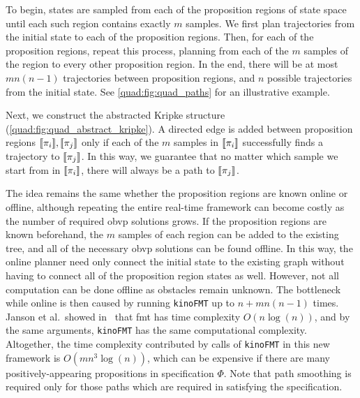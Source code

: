 To begin, states are sampled from each of the proposition regions of state space until each such region contains exactly $m$ samples. We first plan trajectories from the initial state to each of the proposition regions. Then, for each of the proposition regions, repeat this process, planning from each of the $m$ samples of the region to every other proposition region. In the end, there will be at most $mn(n-1)$ trajectories between proposition regions, and $n$ possible trajectories from the initial state. See \autoref{quad:fig:quad_paths} for an illustrative example.

Next, we construct the abstracted Kripke structure (\autoref{quad:fig:quad_abstract_kripke}). A directed edge is added between proposition regions ${\llbracket}{} \pi_i {\rrbracket}{}, {\llbracket}{} \pi_j {\rrbracket}{}$ only if each of the $m$ samples in ${\llbracket}{} \pi_i {\rrbracket}{}$ successfully finds a trajectory to ${\llbracket}{} \pi_j {\rrbracket}{}$. In this way, we guarantee that no matter which sample we start from in ${\llbracket}{} \pi_i {\rrbracket}{}$, there will always be a path to ${\llbracket}{} \pi_j {\rrbracket}{}$.

The idea remains the same whether the proposition regions are known online or offline, although repeating the entire real-time framework can become costly as the number of required \gls{obvp} solutions grows. If the proposition regions are known beforehand, the $m$ samples of each region can be added to the existing tree, and all of the necessary \gls{obvp} solutions can be found offline. In this way, the online planner need only connect the initial state to the existing graph without having to connect all of the proposition region states as well. However, not all computation can be done offline as obstacles remain unknown. The bottleneck while online is then caused by running \texttt{kinoFMT} up to $n+mn(n-1)$ times. Janson et al.\ showed in~\cite{Janson2015} that \gls{fmt} has time complexity $O(n\log(n))$, and by the same arguments, \texttt{kinoFMT} has the same computational complexity. Altogether, the time complexity contributed by calls of \texttt{kinoFMT} in this new framework is $O(mn^3 \log(n))$, which can be expensive if there are many positively-appearing propositions in specification $\Phi$. Note that path smoothing is required only for those paths which are required in satisfying the specification.

